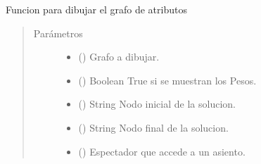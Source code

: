 \documentclass[letterpaper,10pt,spanish]{sphinxmanual}
\begin{document}
\begin{fulllineitems}
\label{\detokenize{Funciones:Funciones.DibujarGrafoOcupacion}}
\sphinxAtStartPar
Funcion para dibujar el grafo de atributos
\begin{quote}\begin{description}
\item[{Parámetros}] \leavevmode\begin{itemize}
\item {} 
\sphinxAtStartPar
{} () \textendash{} Grafo a dibujar.

\item {} 
\sphinxAtStartPar
{} () \textendash{} Boolean \sphinxhyphen{} True si se muestran los Pesos.

\item {} 
\sphinxAtStartPar
{} () \textendash{} String \sphinxhyphen{} Nodo inicial de la solucion.

\item {} 
\sphinxAtStartPar
{} () \textendash{} String \sphinxhyphen{} Nodo final de la solucion.

\item {} 
\sphinxAtStartPar
{} ({\hyperref[\detokenize{Clases:Clases.Espectador}]{}}) \textendash{} Espectador que accede a un asiento.


\end{itemize}
\end{description}
\end{quote}
\end{fulllineitems}
\end{document}
